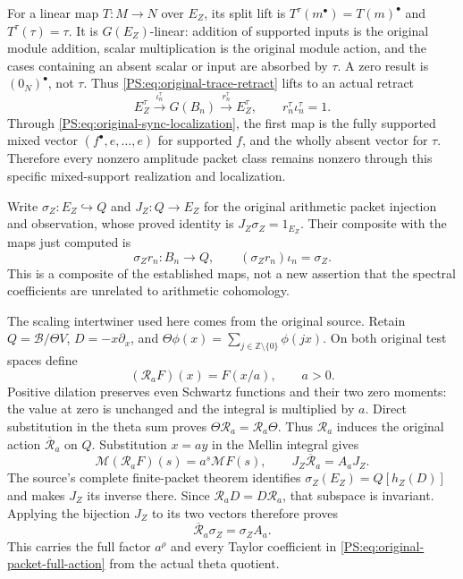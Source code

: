 For a linear map $T:M\to N$ over $E_Z$, its split lift is
$T^\tau(m^\bullet)=T(m)^\bullet$ and $T^\tau(\tau)=\tau$.
It is $G(E_Z)$-linear: addition of supported inputs is the original
module addition, scalar multiplication is the original module action,
and the cases containing an absent scalar or input are absorbed by
$\tau$. A zero result is $(0_N)^\bullet$, not $\tau$.
Thus \eqref{PS:eq:original-trace-retract} lifts to an actual retract
\begin{equation}
 E_Z^\tau\xrightarrow{\iota_n^\tau}G(B_n)
 \xrightarrow{r_n^\tau}E_Z^\tau,
 \qquad r_n^\tau\iota_n^\tau=1.
 \label{PS:eq:original-split-retract}
\end{equation}
Through \eqref{PS:eq:original-sync-localization}, the first map is the
fully supported mixed vector $(f^\bullet,e,\ldots,e)$ for supported
$f$, and the wholly absent vector for $\tau$. Therefore every
nonzero amplitude packet class remains nonzero through this specific
mixed-support realization and localization.

Write $\sigma_Z:E_Z\hookrightarrow Q$ and $J_Z:Q\to E_Z$ for
the original arithmetic packet injection and observation, whose
proved identity is $J_Z\sigma_Z=1_{E_Z}$. Their composite with the
maps just computed is
\[
 \sigma_Zr_n:B_n\longrightarrow Q,\qquad
 (\sigma_Zr_n)\iota_n=\sigma_Z.
\]
This is a composite of the established maps, not a new assertion that
the spectral coefficients are unrelated to arithmetic cohomology.

The scaling intertwiner used here comes from the original source.
Retain $Q=\mathscr B/\Theta V$, $D=-x\partial_x$, and
$\Theta\phi(x)=\sum_{j\in\mathbb Z\setminus\{0\}}\phi(jx)$.
On both original test spaces define
\[
 (\mathcal R_aF)(x)=F(x/a),\qquad a>0.
\]
Positive dilation preserves even Schwartz functions and their two
zero moments: the value at zero is unchanged and the integral is
multiplied by $a$. Direct substitution in the theta sum proves
$\Theta\mathcal R_a=\mathcal R_a\Theta$.
Thus $\mathcal R_a$ induces the original action $\overline{\mathcal R}_a$
on $Q$. Substitution $x=ay$ in the Mellin integral gives
\[
 \mathcal M(\mathcal R_aF)(s)=a^s\mathcal MF(s),\qquad
 J_Z\overline{\mathcal R}_a=A_aJ_Z.
\]
The source's complete finite-packet theorem identifies
$\sigma_Z(E_Z)=Q[h_Z(D)]$ and makes $J_Z$ its inverse there.
Since $\mathcal R_aD=D\mathcal R_a$, that subspace is invariant.
Applying the bijection $J_Z$ to its two vectors therefore proves
\[
 \overline{\mathcal R}_a\sigma_Z=\sigma_ZA_a.
\]
This carries the full factor $a^\rho$ and every Taylor coefficient in
\eqref{PS:eq:original-packet-full-action} from the actual theta quotient.

